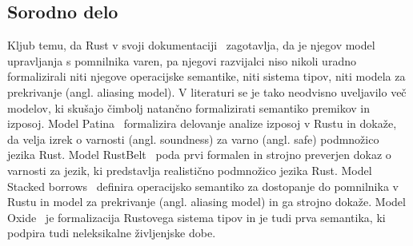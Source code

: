 \subsection{Sorodno delo}
Kljub temu, da Rust v svoji dokumentaciji~\cite{klabnik2023rust} zagotavlja, da je njegov model upravljanja s pomnilnika varen, pa njegovi razvijalci niso nikoli uradno formalizirali niti njegove operacijske semantike, niti sistema tipov, niti modela za prekrivanje (angl. aliasing model). V literaturi se je tako neodvisno uveljavilo več modelov, ki skušajo čimbolj natančno formalizirati semantiko premikov in izposoj. Model Patina~\cite{reed2015patina} formalizira delovanje analize izposoj v Rustu in dokaže, da velja izrek o varnosti (angl. soundness) za varno (angl. safe) podmnožico jezika Rust. Model RustBelt~\cite{10.1145/3158154} poda prvi formalen in strojno preverjen dokaz o varnosti za jezik, ki predstavlja realistično podmnožico jezika Rust. Model Stacked borrows~\cite{StackedBorrows} definira operacijsko semantiko za dostopanje do pomnilnika v Rustu in model za prekrivanje (angl. aliasing model) in ga strojno dokaže. Model Oxide~\cite{weiss2021oxide} je formalizacija Rustovega sistema tipov in je tudi prva semantika, ki podpira tudi neleksikalne življenjske dobe. 